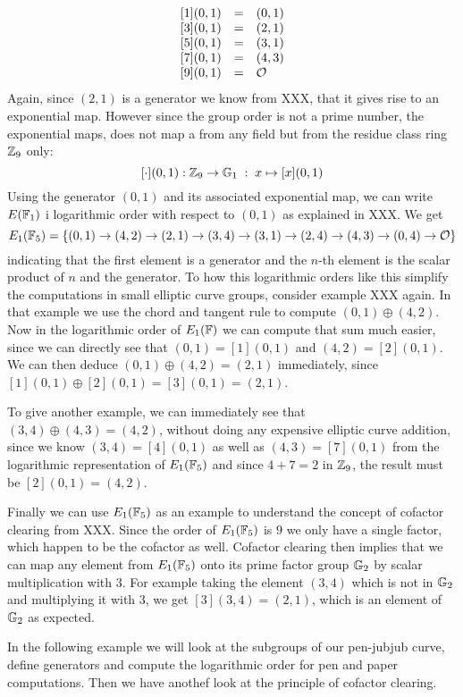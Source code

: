 \begin{example}
$$\begin{array}{lccr}
{}\begin{array}{lcl}
{}[1](0,1) &=& (0, 1) \\
{}[3](0,1) &=& (2, 1) \\
{}[5](0,1) &=& (3, 1) \\
{}[7](0,1) &=& (4, 3) \\
{}[9](0,1) &=& \mathcal{O}
\end{array}
\end{array}
$$
Again, since $(2,1)$ is a generator we know from XXX, that it gives rise to an exponential map. However since the group order is not a prime number, the exponential maps, does not map a from any field but from the residue class ring $\mathbb{Z}_9$ only:
$$
[\cdot](0,1): \mathbb{Z}_9 \to \mathbb{G}_1\; : \; x\mapsto [x](0,1)
$$
Using the generator $(0,1)$ and its associated exponential map, we can write $E(\mathbb{F}_1)$ i logarithmic order with respect to $(0,1)$ as explained in XXX. We get
$$
E_1(\mathbb{F}_5) = \{(0, 1)\to (4, 2)\to (2, 1)\to (3, 4)\to (3, 1)\to (2, 4)\to (4, 3)\to (0, 4)\to \mathcal{O} \}
$$
indicating that the first element is a generator and the $n$-th element is the scalar product of $n$ and the generator. To how this logarithmic orders like this simplify the computations in small elliptic curve groups, consider example XXX again. In that example we use the chord and tangent rule to compute $(0,1)\oplus (4,2)$. Now in the logarithmic order of $E_1(\mathbb{F})$ we can compute that sum much easier, since we can directly see that $(0,1)=[1](0,1)$ and $(4,2)=[2](0,1)$. We can then deduce $(0,1)\oplus (4,2)= (2,1)$ immediately, since $[1](0,1)\oplus [2](0,1)= [3](0,1)=(2,1)$.

To give another example, we can immediately see that $(3,4)\oplus (4,3) = (4,2)$, without doing any expensive elliptic curve addition, since we know $(3,4)= [4](0,1)$ as well as $(4,3)= [7](0,1)$ from the logarithmic representation of $E_1(\mathbb{F}_5)$ and since $4+7 = 2$ in $\mathbb{Z}_9$, the result must be $[2](0,1)=(4,2)$.

Finally we can use $E_1(\mathbb{F}_5)$ as an example to understand the concept of cofactor clearing from XXX. Since the order of $E_1(\mathbb{F}_5)$ is $9$ we only have a single factor, which happen to be the cofactor as well. Cofactor clearing then implies that we can map any element from $E_1(\mathbb{F}_5)$ onto its prime factor group $\mathbb{G}_2$ by scalar multiplication with $3$. For example taking the element $(3,4)$ which is not in $\mathbb{G}_2$ and multiplying it with $3$, we get $[3](3,4)= (2,1)$, which is an element of $\mathbb{G}_2$ as expected.
\end{example}
In the following example we will look at the subgroups of our pen-jubjub curve, define generators and compute the logarithmic order for pen and paper computations. Then we have anothef look at the principle of cofactor clearing.
